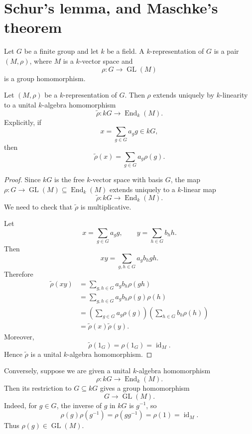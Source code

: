 \section{Schur's lemma, and Maschke's theorem}
Let \(G\) be a finite group and let \(k\) be a field. A \(k\)-representation
of \(G\) is a pair \((M,\rho)\), where \(M\) is a \(k\)-vector space and
\[
    \rho:G\longrightarrow \operatorname{GL}(M)
\]
is a group homomorphism.

\begin{proposition}
    Let \((M,\rho)\) be a \(k\)-representation of \(G\). Then \(\rho\) extends
    uniquely by \(k\)-linearity to a unital \(k\)-algebra homomorphism
    \[
        \widetilde{\rho}:kG\longrightarrow \operatorname{End}_k(M).
    \]
    Explicitly, if
    \[
        x=\sum_{g\in G}a_g g\in kG,
    \]
    then
    \[
        \widetilde{\rho}(x)
        =
        \sum_{g\in G}a_g \rho(g).
    \]
\end{proposition}

\begin{proof}
    Since \(kG\) is the free \(k\)-vector space with basis \(G\), the map
    \(\rho:G\to \operatorname{GL}(M)\subseteq \operatorname{End}_k(M)\) extends
    uniquely to a \(k\)-linear map
    \[
        \widetilde{\rho}:kG\to \operatorname{End}_k(M).
    \]
    We need to check that \(\widetilde{\rho}\) is multiplicative.

    Let
    \[
        x=\sum_{g\in G}a_g g,
        \qquad
        y=\sum_{h\in G}b_h h.
    \]
    Then
    \[
        xy
        =
        \sum_{g,h\in G}a_gb_h gh.
    \]
    Therefore
    \[
        \begin{aligned}
            \widetilde{\rho}(xy)
             & =
            \sum_{g,h\in G}a_gb_h \rho(gh)       \\
             & =
            \sum_{g,h\in G}a_gb_h \rho(g)\rho(h) \\
             & =
            \left(\sum_{g\in G}a_g\rho(g)\right)
            \left(\sum_{h\in G}b_h\rho(h)\right) \\
             & =
            \widetilde{\rho}(x)\widetilde{\rho}(y).
        \end{aligned}
    \]
    Moreover,
    \[
        \widetilde{\rho}(1_G)=\rho(1_G)=\operatorname{id}_M.
    \]
    Hence \(\widetilde{\rho}\) is a unital \(k\)-algebra homomorphism.
\end{proof}

Conversely, suppose we are given a unital \(k\)-algebra homomorphism
\[
    \rho:kG\longrightarrow \operatorname{End}_k(M).
\]
Then its restriction to \(G\subseteq kG\) gives a group homomorphism
\[
    G\longrightarrow \operatorname{GL}(M).
\]
Indeed, for \(g\in G\), the inverse of \(g\) in \(kG\) is \(g^{-1}\), so
\[
    \rho(g)\rho(g^{-1})
    =
    \rho(gg^{-1})
    =
    \rho(1)
    =
    \operatorname{id}_M.
\]
Thus \(\rho(g)\in \operatorname{GL}(M)\).


